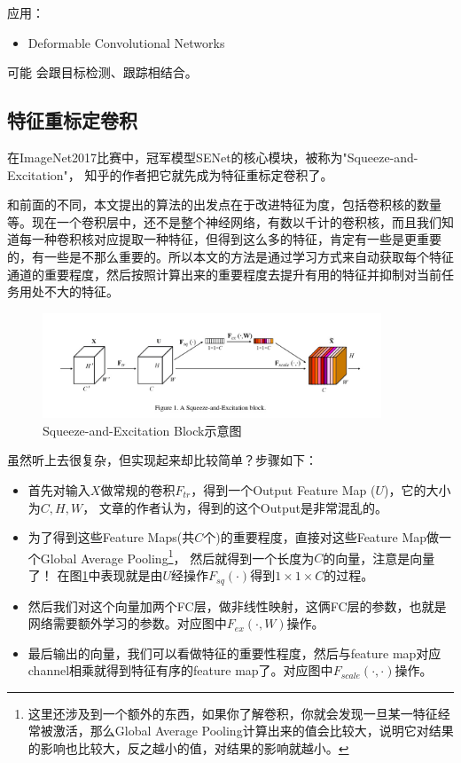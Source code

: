 应用：
\begin{itemize}
\item Deformable Convolutional Networks
\end{itemize}

可能 会跟目标检测、跟踪相结合。

\subsection{特征重标定卷积}

在ImageNet2017比赛中，冠军模型SENet的核心模块，被称为"Squeeze-and-Excitation"， 知乎的作者把它就先成为特征重标定卷积了。

和前面的不同，本文提出的算法的出发点在于改进特征为度，包括卷积核的数量等。现在一个卷积层中，还不是整个神经网络，有数以千计的卷积核，而且我们知道每一种卷积核对应提取一种特征，但得到这么多的特征，肯定有一些是更重要的，有一些是不那么重要的。所以本文的方法是通过学习方式来自动获取每个特征通道的重要程度，然后按照计算出来的重要程度去提升有用的特征并抑制对当前任务用处不大的特征。

\begin{figure}[!htbp]
\centering
\includegraphics[width=0.9\textwidth]{DLTips/SENetConv0.jpg}
\caption{Squeeze-and-Excitation Block示意图}
\label{SENetConv0}
\end{figure}

虽然听上去很复杂，但实现起来却比较简单？步骤如下：
\begin{itemize}
\item 首先对输入$X$做常规的卷积$F_{tr}$，得到一个Output Feature Map ($U$)，它的大小为$C, H, W$， 文章的作者认为，得到的这个Output是非常混乱的。
\item 为了得到这些Feature Maps(共$C$个)的重要程度，直接对这些Feature Map做一个Global Average Pooling\footnote{这里还涉及到一个额外的东西，如果你了解卷积，你就会发现一旦某一特征经常被激活，那么Global Average Pooling计算出来的值会比较大，说明它对结果的影响也比较大，反之越小的值，对结果的影响就越小。}， 然后就得到一个长度为$C$的向量，注意是向量了！ 在图\ref{SENetConv0}中表现就是由$U$经操作$F_{sq}(\cdot)$得到$1 \times 1 \times C$的过程。

\item 然后我们对这个向量加两个FC层，做非线性映射，这俩FC层的参数，也就是网络需要额外学习的参数。对应图中$F_{ex}(\cdot, W)$操作。

\item 最后输出的向量，我们可以看做特征的重要性程度，然后与feature map对应channel相乘就得到特征有序的feature map了。对应图中$F_{scale}(\cdot, \cdot)$操作。
\end{itemize}

